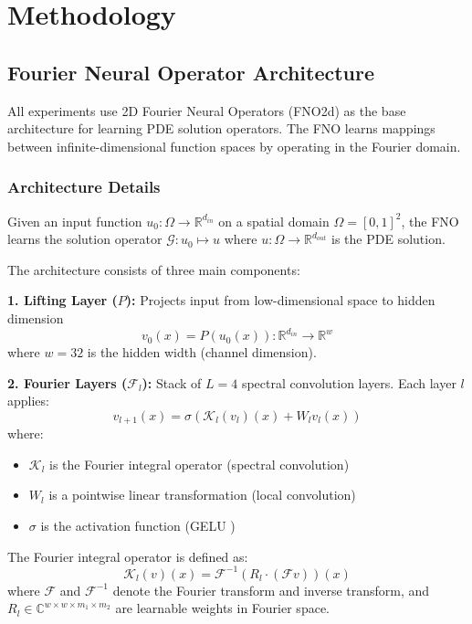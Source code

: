 \chapter{Methodology}

\section{Fourier Neural Operator Architecture}

All experiments use 2D Fourier Neural Operators (FNO2d) as the base architecture for learning PDE solution operators. The FNO learns mappings between infinite-dimensional function spaces by operating in the Fourier domain.

\subsection{Architecture Details}

Given an input function $u_0: \Omega \rightarrow \mathbb{R}^{d_{in}}$ on a spatial domain $\Omega = [0,1]^2$, the FNO learns the solution operator $\mathcal{G}: u_0 \mapsto u$ where $u: \Omega \rightarrow \mathbb{R}^{d_{out}}$ is the PDE solution.

The architecture consists of three main components:

\textbf{1. Lifting Layer ($P$):} Projects input from low-dimensional space to hidden dimension
\begin{equation}
v_0(x) = P(u_0(x)) : \mathbb{R}^{d_{in}} \rightarrow \mathbb{R}^w
\end{equation}
where $w = 32$ is the hidden width (channel dimension).

\textbf{2. Fourier Layers ($\mathcal{F}_l$):} Stack of $L = 4$ spectral convolution layers. Each layer $l$ applies:
\begin{equation}
v_{l+1}(x) = \sigma\left(\mathcal{K}_l(v_l)(x) + W_l v_l(x)\right)
\end{equation}
where:
\begin{itemize}
\item $\mathcal{K}_l$ is the Fourier integral operator (spectral convolution)
\item $W_l$ is a pointwise linear transformation (local convolution)
\item $\sigma$ is the activation function (GELU \cite{hendrycks2016gaussian})
\end{itemize}

The Fourier integral operator is defined as:
\begin{equation}
\mathcal{K}_l(v)(x) = \mathcal{F}^{-1}\left(R_l \cdot (\mathcal{F}v)\right)(x)
\end{equation}
where $\mathcal{F}$ and $\mathcal{F}^{-1}$ denote the Fourier transform and inverse transform, and $R_l \in \mathbb{C}^{w \times w \times m_1 \times m_2}$ are learnable weights in Fourier space.

